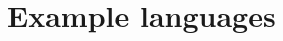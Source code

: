 	\section{Example languages} \label{s:dependency-viewpoint-template:example-languages}
		\begin{comment}
			UML component diagrams and UML package diagrams showing dependencies among subsystems (OMG
			[B28]).
		\end{comment}